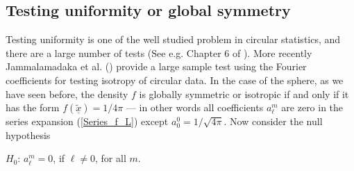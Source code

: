 \documentclass[preprint,11pt,a4paper]{elsarticle}
\begin{document}
\subsection{Testing uniformity or global symmetry}

Testing uniformity is one of the well studied problem in circular
statistics, and there are a large number of tests (See e.g. Chapter 6 of 
\cite{jammalamadaka2001topics}). More recently Jammalamadaka et al. (\cite%
{RaoJammalamadaka2017}) provide a large sample test using the Fourier
coefficients for testing isotropy of circular data. In the case of the
sphere, as we have seen before, the density $f$ is globally symmetric or
isotropic if and only if it has the form $f\left( \underline{\widetilde{x}}%
\right) =1/4\pi$ --- in other words all coefficients $a_{\ell}^{m}$ are zero
in the series expansion (\ref{Series_f_L}) except $a_{0}^{0}=1/\sqrt{4\pi}$.
Now consider the null hypothesis

\begin{center}
$H_{0}$: $a_{\ell}^{m}=0$, if $\ell\neq0$, for all $m$.
\end{center}
\end{document}
